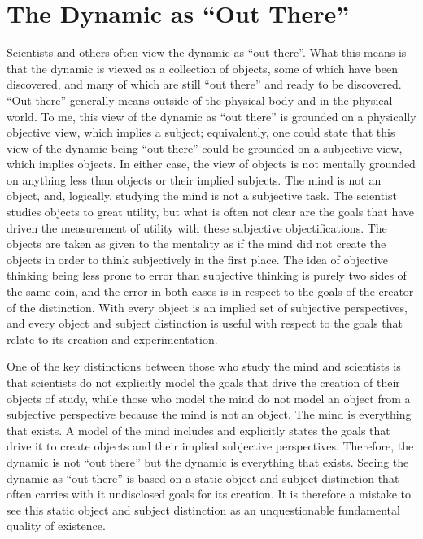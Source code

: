 \section{The Dynamic as ``Out There''}

Scientists and others often view the dynamic as ``out there''.  What
this means is that the dynamic is viewed as a collection of objects,
some of which have been discovered, and many of which are still ``out
there'' and ready to be discovered.  ``Out there'' generally means
outside of the physical body and in the physical world.  To me, this
view of the dynamic as ``out there'' is grounded on a physically
objective view, which implies a subject; equivalently, one could state
that this view of the dynamic being ``out there'' could be grounded on
a subjective view, which implies objects.  In either case, the view of
objects is not mentally grounded on anything less than objects or
their implied subjects.  The mind is not an object, and, logically,
studying the mind is not a subjective task.  The scientist studies
objects to great utility, but what is often not clear are the goals
that have driven the measurement of utility with these subjective
objectifications.  The objects are taken as given to the mentality as
if the mind did not create the objects in order to think subjectively
in the first place.  The idea of objective thinking being less prone
to error than subjective thinking is purely two sides of the same
coin, and the error in both cases is in respect to the goals of the
creator of the distinction.  With every object is an implied set of
subjective perspectives, and every object and subject distinction is
useful with respect to the goals that relate to its creation and
experimentation.

One of the key distinctions between those who study the mind and
scientists is that scientists do not explicitly model the goals that
drive the creation of their objects of study, while those who model
the mind do not model an object from a subjective perspective because
the mind is not an object.  The mind is everything that exists.  A
model of the mind includes and explicitly states the goals that drive
it to create objects and their implied subjective perspectives.
Therefore, the dynamic is not ``out there'' but the dynamic is
everything that exists.  Seeing the dynamic as ``out there'' is based
on a static object and subject distinction that often carries with it
undisclosed goals for its creation.  It is therefore a mistake to see
this static object and subject distinction as an unquestionable
fundamental quality of existence.

